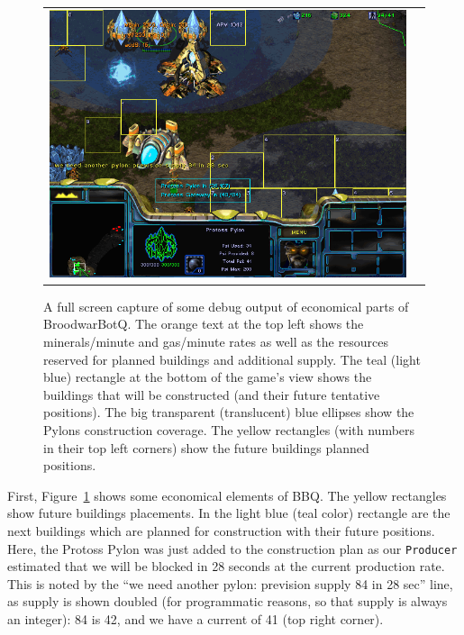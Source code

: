 \begin{figure}[h]
\begin{center}
\begin{tabular}{cc}
\includegraphics[width=0.90\columnwidth]{images/botgame/macro0.png}
\end{tabular}
\caption{A full screen capture of some debug output of economical parts of BroodwarBotQ. The orange text at the top left shows the minerals/minute and gas/minute rates as well as the resources reserved for planned buildings and additional supply. The teal (light blue) rectangle at the bottom of the game's view shows the buildings that will be constructed (and their future tentative positions). The big transparent (translucent) blue ellipses show the Pylons construction coverage. The yellow rectangles (with numbers in their top left corners) show the future buildings planned positions.}
\label{fig:bot_macro}
\end{center}
\end{figure}

First, Figure~\ref{fig:bot_macro} shows some economical elements of BBQ. The yellow rectangles show future buildings placements. In the light blue (teal color) rectangle are the next buildings which are planned for construction with their future positions. Here, the Protoss Pylon was just added to the construction plan as our \texttt{Producer} estimated that we will be  blocked in 28 seconds at the current production rate. This is noted by the ``we need another pylon: prevision supply 84 in 28 sec'' line, as supply is shown doubled (for programmatic reasons, so that supply is always an integer): 84 is 42, and we have a current  of 41 (top right corner). 

